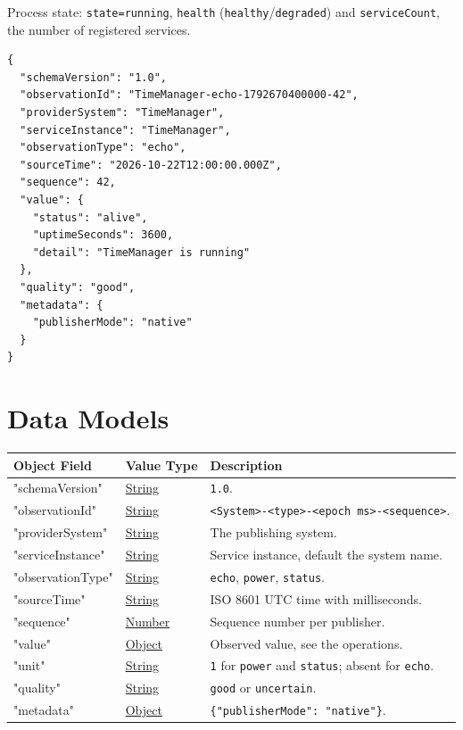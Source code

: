 \documentclass[a4paper]{arrowhead}
\newcommand{\oref}[1]{{\textcolor{ArrowheadBlue}{\hyperref[sec:operations:#1]{#1}}}}
\newcommand{\pref}[1]{{\textcolor{ArrowheadGrey}{\hyperref[sec:model:primitives:#1]{#1}}}}
\begin{document}
Process state: \texttt{state=\allowbreak{}running}, \texttt{health} (\texttt{healthy}/\texttt{degraded}) and \texttt{serviceCount}, the number of registered services.

\begin{lstlisting}[caption={An \oref{echo} observation.}]
{
  "schemaVersion": "1.0",
  "observationId": "TimeManager-echo-1792670400000-42",
  "providerSystem": "TimeManager",
  "serviceInstance": "TimeManager",
  "observationType": "echo",
  "sourceTime": "2026-10-22T12:00:00.000Z",
  "sequence": 42,
  "value": {
    "status": "alive",
    "uptimeSeconds": 3600,
    "detail": "TimeManager is running"
  },
  "quality": "good",
  "metadata": {
    "publisherMode": "native"
  }
}
\end{lstlisting}

\newpage

\section{Data Models}
\label{sec:model}


\noindent\begin{tabularx}{\textwidth}{| p{4.25cm} | p{3.5cm} | X |} \hline
\rowcolor{gray!33} Object Field & Value Type & Description \\ \hline
"schemaVersion" & \pref{String} & \texttt{1.0}. \\ \hline
"observationId" & \pref{String} & \texttt{<System>-<type>-<epoch ms>-<sequence>}. \\ \hline
"providerSystem" & \pref{String} & The publishing system. \\ \hline
"serviceInstance" & \pref{String} & Service instance, default the system name. \\ \hline
"observationType" & \pref{String} & \texttt{echo}, \texttt{power}, \texttt{status}. \\ \hline
"sourceTime" & \pref{String} & ISO 8601 UTC time with milliseconds. \\ \hline
"sequence" & \pref{Number} & Sequence number per publisher. \\ \hline
"value" & \pref{Object} & Observed value, see the operations. \\ \hline
"unit" & \pref{String} & \texttt{1} for \texttt{power} and \texttt{status}; absent for \texttt{echo}. \\ \hline
"quality" & \pref{String} & \texttt{good} or \texttt{uncertain}. \\ \hline
"metadata" & \pref{Object} & \texttt{\{"publisherMode": "native"\}}. \\ \hline
\end{tabularx}
\end{document}
